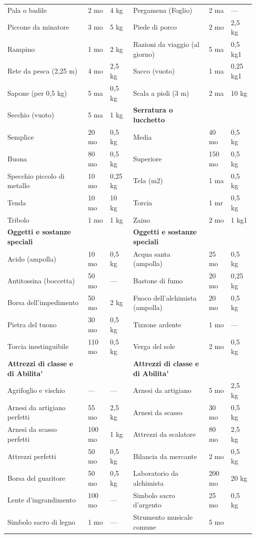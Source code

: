 \documentclass[a4paper,11pt,twoside,openany]{book}
\begin{document}
{\begin{longtable}{|L{4cm} |k{1.5cm} |k{1.5cm}|L{5cm} |k{1.5cm} |k{1.5cm}|}
Pala o badile&2 mo&4 kg&	Pergamena (Foglio)&2 ma&—\\
Piccone da minatore&3 mo&5 kg&	Piede di porco&2 mo&2,5 kg\\
Rampino&1 mo&2 kg&	Razioni da viaggio (al giorno)&5 ma&0,5 kg1\\
Rete da pesca (2,25 m)&4 mo&2,5 kg&	Sacco (vuoto)&1 ma&0,25 kg1\\
Sapone (per 0,5 kg)&5 ma&0,5 kg&	Scala a pioli (3 m)&2 ma&10 kg\\
Secchio (vuoto)&5 ma&1 kg&	\textbf{Serratura o lucchetto}&&\\
Semplice&20 mo&0,5 kg&	Media&40 mo&0,5 kg\\
Buona&80 mo&0,5 kg&	Superiore&150 mo&0,5 kg\\
Specchio piccolo di metallo&10 mo&0,25 kg&	Tela (m2)&1 ma&0,5 kg\\
Tenda&10 mo&10 kg&	Torcia&1 mr&0,5 kg\\
Tribolo&1 mo&1 kg&	Zaino&2 mo&1 kg1\\
\textbf{Oggetti e sostanze speciali}&&&	\textbf{Oggetti e sostanze speciali}&&\\
Acido (ampolla)&10 mo&0,5 kg&	Acqua santa (ampolla)&25 mo&0,5 kg\\
Antitossina (boccetta)&50 mo&—&	Bastone di fumo&20 mo&0,25 kg\\
Borsa dell’impedimento&50 mo&2 kg&	Fuoco dell’alchimista (ampolla)&20 mo&0,5 kg\\
Pietra del tuono&30 mo&0,5 kg&	Tizzone ardente&1 mo&—\\
Torcia inestinguibile&110 mo&0,5 kg&	Verga del sole&2 mo&0,5 kg\\
\textbf{Attrezzi di classe e di Abilita'}&&&\textbf{Attrezzi di classe e di Abilita'}&&\\
Agrifoglio e vischio&—&—&	Arnesi da artigiano&5 mo&2,5 kg\\
Arnesi da artigiano perfetti&55 mo&2,5 kg&	Arnesi da scasso&30 mo&0,5 kg\\
Arnesi da scasso perfetti&100 mo&1 kg&	Attrezzi da scalatore&80 mo&2,5 kg\\
Attrezzi perfetti&50 mo&0,5 kg&	Bilancia da mercante&2 mo&0,5 kg\\
Borsa del guaritore&50 mo&0,5 kg&	Laboratorio da alchimista&200 mo&20 kg\\
Lente d’ingrandimento&100 mo&—&	Simbolo sacro d’argento&25 mo&0,5 kg\\
Simbolo sacro di legno&1 mo&—&	Strumento musicale comune&5 mo\\

\end{longtable}}
\end{document}
